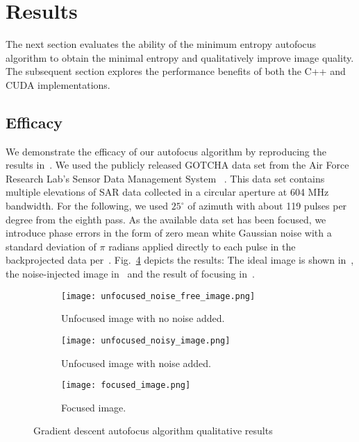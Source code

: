 \section{Results}\label{sec:results}

The next section evaluates the ability of the minimum entropy autofocus
algorithm to obtain the minimal entropy and qualitatively improve image quality.
The subsequent section explores the performance benefits of both the C++ and
CUDA implementations.

\subsection{Efficacy}

We demonstrate the efficacy of our autofocus algorithm by reproducing the
results in~\cite{ash2012autofocus}. We used the publicly released GOTCHA data
set from the Air Force Research Lab's Sensor Data Management System
~\cite{gotcha}. This data set contains multiple elevations of SAR data collected
in a circular aperture at 604 MHz bandwidth. For the following, we used
$25^{\circ}$ of azimuth with about 119 pulses per degree from the eighth pass.
As the available data set has been focused, we introduce phase errors in the
form of zero mean white Gaussian noise with a standard deviation of $\pi$
radians applied directly to each pulse in the backprojected data
per~\cite{ash2012autofocus}. Fig.~\ref{fig:efficacy} depicts the results: The
ideal image is shown in~, the noise-injected image
in~ and the result of focusing in~.

\begin{figure}
  \centering
  \begin{subfigure}{0.5\textwidth}
    \centering
    \texttt{[image: unfocused\_noise\_free\_image.png]}
    \caption{Unfocused image with no noise added.}
    \label{fig:ideal}
  \end{subfigure}
  \vfill
  \begin{subfigure}{0.5\textwidth}
    \centering
    \texttt{[image: unfocused\_noisy\_image.png]}
    \caption{Unfocused image with noise added.}
    \label{fig:unfocused}
  \end{subfigure}
  \vfill
  \begin{subfigure}{0.5\textwidth}
    \centering
    \texttt{[image: focused\_image.png]}
    \caption{Focused image.}
    \label{fig:focused}
  \end{subfigure}
  \vspace{5 mm}
  \caption{Gradient descent autofocus algorithm qualitative results}
  \label{fig:efficacy}
\end{figure}

